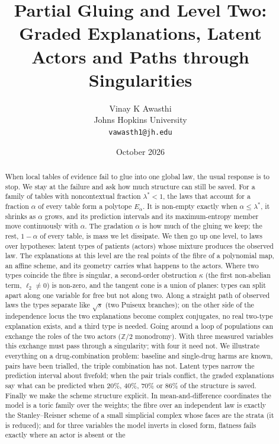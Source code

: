 \documentclass[11pt]{article}
\title{Partial Gluing and Level Two:\\ Graded Explanations, Latent Actors and Paths through Singularities}
\author{Vinay K Awasthi\\ Johns Hopkins University\\ \texttt{vawasth1@jh.edu}}
\date{October 2026}
\theoremstyle{definition}\newtheorem{definition}[theorem]{Definition}\newtheorem{remark}[theorem]{Remark}\newtheorem{example}[theorem]{Example}
\begin{document}
\maketitle

\begin{abstract}
When local tables of evidence fail to glue into one global law, the usual response is to stop. We stay at the failure and ask how much
structure can still be saved. For a family of tables with noncontextual fraction $\lambda^*<1$, the laws that account for a fraction
$\alpha$ of every table form a polytope $E_\alpha$. It is non-empty exactly when $\alpha\le\lambda^*$, it shrinks as $\alpha$ grows, and
its prediction intervals and its maximum-entropy member move continuously with $\alpha$. The gradation $\alpha$ is how much of the gluing
we keep; the rest, $1-\alpha$ of every table, is mass we let dissipate. We then go up one level, to laws over hypotheses: latent types of
patients (actors) whose mixture produces the observed law. The explanations at this level are the real points of the fibre of a
polynomial map, an affine scheme, and its geometry carries what happens to the actors. Where two types coincide the fibre is singular, a
second-order obstruction $\kappa$ (the first non-abelian term, $\ell_2\neq 0$) is non-zero, and the tangent cone is a union of planes:
types can split apart along one variable for free but not along two. Along a straight path of observed laws the types separate like
$\sqrt{s}$ (two Puiseux branches); on the other side of the independence locus the two explanations become complex conjugates, no real
two-type explanation exists, and a third type is needed. Going around a loop of populations can exchange the roles of the two actors ($\mathbb Z/2$ monodromy). With three measured
variables this exchange must pass through a singularity; with four it need not. We illustrate everything on a drug-combination problem:
baseline and single-drug harms are known, pairs have been trialled, the triple combination has not. Latent types narrow the prediction
interval about fivefold; when the pair trials conflict, the graded explanations say what can be predicted when 20\%, 40\%, 70\% or 86\%
of the structure is saved. Finally we make the scheme structure explicit. In mean-and-difference coordinates the model is a toric family
over the weights; the fibre over an independent law is exactly the Stanley--Reisner scheme of a small simplicial complex whose faces are the
strata (it is reduced); and for three variables the model inverts in closed form, flatness fails exactly where an actor is absent or the

\end{abstract}
\end{document}
